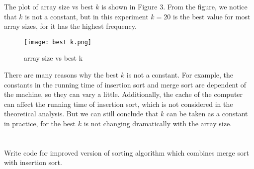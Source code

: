 \documentclass[UTF8]{ctexart}
\begin{document}
The plot of array size vs best $k$ is shown in Figure 3. From the figure, we notice that $k$ is not a constant, but 
in this experiment $k = 20$ is the best value for most array sizes, for it has the highest frequency.\\
\begin{figure}[H]
    \centering
    \texttt{[image: best k.png]}
    \caption{array size vs best k}
\end{figure}
There are many reasons why the best $k$ is not a constant. For example, the constants in the running time of insertion sort and merge sort are dependent of the machine, so they can vary a little.
Additionally, the cache of the computer can affect the running time of insertion sort, which is not considered in the theoretical analysis. But we can still conclude that $k$ can be taken as a constant in practice, for the best $k$ is not changing dramatically with the array size.\\
    
\section{}
Write code for improved version of sorting algorithm which combines merge sort with insertion sort.\\
\end{document}
